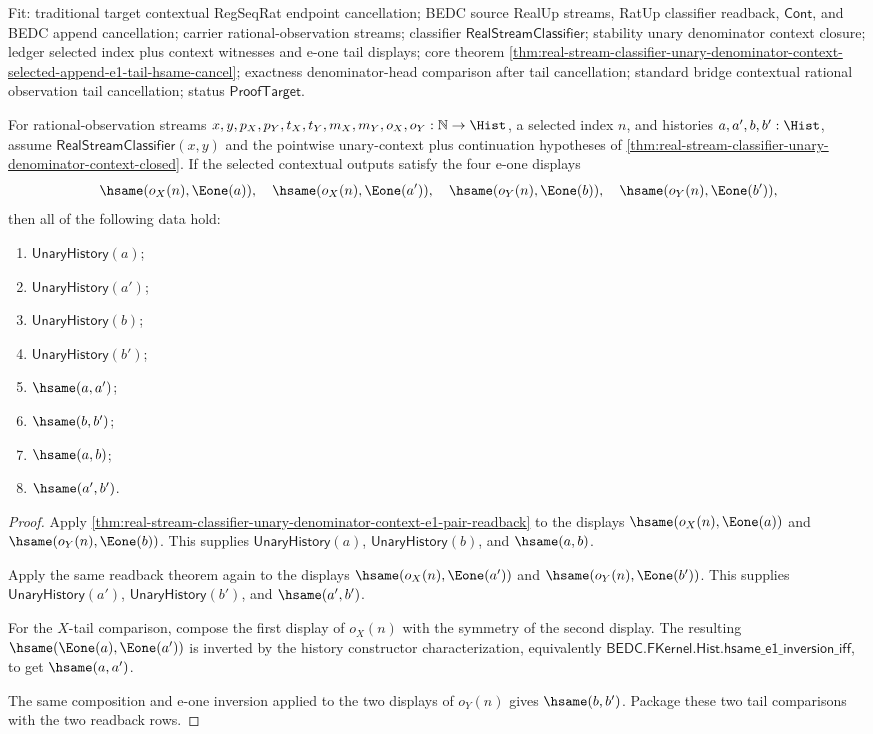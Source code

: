 Fit: traditional target contextual RegSeqRat endpoint cancellation; BEDC
source RealUp streams, RatUp classifier readback, $\mathsf{Cont}$, and BEDC
append cancellation; carrier rational-observation streams; classifier
$\mathsf{RealStreamClassifier}$; stability unary denominator context closure;
ledger selected index plus context witnesses and e-one tail displays; core
theorem
\autoref{thm:real-stream-classifier-unary-denominator-context-selected-append-e1-tail-hsame-cancel};
exactness denominator-head comparison after tail cancellation; standard bridge
contextual rational observation tail cancellation; status
$\mathsf{ProofTarget}$.

\begin{theorem}
\label{thm:real-stream-classifier-unary-denominator-context-selected-e1-tail-determinacy}
For rational-observation streams
$x,y,p_X,p_Y,t_X,t_Y,m_X,m_Y,o_X,o_Y:\mathbb{N}\to\Hist$, a selected
index $n$, and histories $a,a',b,b':\Hist$, assume
$\mathsf{RealStreamClassifier}(x,y)$ and the pointwise unary-context plus
continuation hypotheses of
\autoref{thm:real-stream-classifier-unary-denominator-context-closed}. If the
selected contextual outputs satisfy the four e-one displays
$$
\hsame(o_X(n),\Eone(a)),\quad
\hsame(o_X(n),\Eone(a')),\quad
\hsame(o_Y(n),\Eone(b)),\quad
\hsame(o_Y(n),\Eone(b')),
$$
then all of the following data hold:
\begin{enumerate}
\item $\mathsf{UnaryHistory}(a)$;
\item $\mathsf{UnaryHistory}(a')$;
\item $\mathsf{UnaryHistory}(b)$;
\item $\mathsf{UnaryHistory}(b')$;
\item $\hsame(a,a')$;
\item $\hsame(b,b')$;
\item $\hsame(a,b)$;
\item $\hsame(a',b')$.
\end{enumerate}
\end{theorem}
\begin{proof}
Apply
\autoref{thm:real-stream-classifier-unary-denominator-context-e1-pair-readback}
to the displays $\hsame(o_X(n),\Eone(a))$ and
$\hsame(o_Y(n),\Eone(b))$. This supplies
$\mathsf{UnaryHistory}(a)$, $\mathsf{UnaryHistory}(b)$, and $\hsame(a,b)$.

Apply the same readback theorem again to the displays
$\hsame(o_X(n),\Eone(a'))$ and $\hsame(o_Y(n),\Eone(b'))$. This supplies
$\mathsf{UnaryHistory}(a')$, $\mathsf{UnaryHistory}(b')$, and
$\hsame(a',b')$.

For the $X$-tail comparison, compose the first display of $o_X(n)$ with the
symmetry of the second display. The resulting
$\hsame(\Eone(a),\Eone(a'))$ is inverted by the history constructor
characterization, equivalently
$\mathsf{BEDC.FKernel.Hist.hsame\_e1\_inversion\_iff}$, to get
$\hsame(a,a')$.

The same composition and e-one inversion applied to the two displays of
$o_Y(n)$ gives $\hsame(b,b')$. Package these two tail comparisons with the
two readback rows.
\end{proof}
